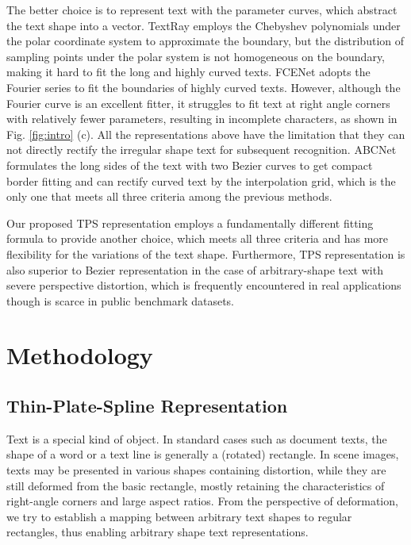 \documentclass[sigconf]{acmart}
\begin{document}
	The better choice is to represent text with the parameter curves, which abstract the text shape into a vector.
	TextRay   \cite{Wang2020textray} employs the Chebyshev polynomials under the polar coordinate system to approximate the boundary,
	but the distribution of sampling points under the polar system is not homogeneous on the boundary, making it hard to fit the long and highly curved texts. 
	FCENet  \cite{zhu2021fourier} adopts the Fourier series to fit the boundaries of highly curved texts. However, although the Fourier curve is an excellent fitter, it struggles to fit text at right angle corners with relatively fewer parameters, resulting in incomplete characters, as shown in Fig. \ref{fig:intro} (c).
	All the representations above have the limitation that they can not directly rectify the irregular shape text for subsequent recognition.
	ABCNet  \cite{Liu2020ABCNet, abcnetv2} formulates the long sides of the text with two Bezier curves to get compact border fitting and can rectify curved text by the interpolation grid, which is the only one that meets all three criteria among the previous methods.
	
	Our proposed TPS representation employs a fundamentally different fitting formula to provide another choice, which meets all three criteria and has more flexibility for the variations of the text shape. Furthermore, TPS representation is also superior to Bezier representation in the case of arbitrary-shape text with severe perspective distortion, which is frequently encountered in real applications though is scarce in public benchmark datasets.
	
	\section{Methodology}
	
	\subsection{Thin-Plate-Spline Representation}
	
	Text is a special kind of object. In standard cases such as document texts, the shape of a word or a text line is generally a (rotated) rectangle. In scene images, texts may be presented in various shapes containing distortion, while they are still deformed from the basic rectangle, mostly retaining the characteristics of right-angle corners and large aspect ratios. From the perspective of deformation, we try to establish a mapping between arbitrary text shapes to regular rectangles, thus enabling arbitrary shape text representations.
	
\end{document}
